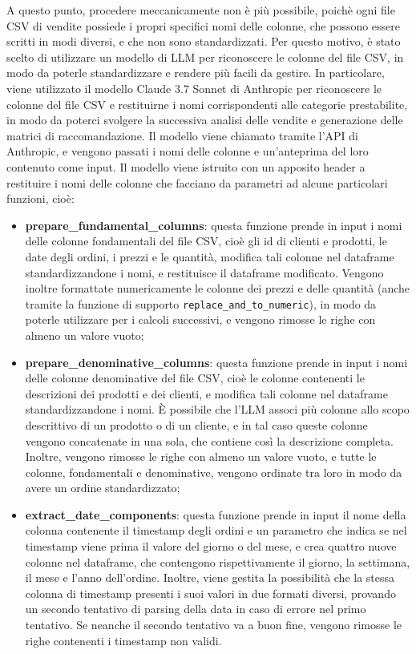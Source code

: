 A questo punto, procedere meccanicamente non è più possibile, poichè ogni file CSV di vendite possiede i propri specifici nomi delle colonne, che possono essere scritti in modi diversi, e che non sono standardizzati. Per questo motivo, è stato scelto di utilizzare un modello di LLM per riconoscere le colonne del file CSV, in modo da poterle standardizzare e rendere più facili da gestire. In particolare, viene utilizzato il modello Claude 3.7 Sonnet di Anthropic per riconoscere le colonne del file CSV e restituirne i nomi corrispondenti alle categorie prestabilite, in modo da poterci svolgere la successiva analisi delle vendite e generazione delle matrici di raccomandazione. Il modello viene chiamato tramite l'API di Anthropic, e vengono passati i nomi delle colonne e un'anteprima del loro contenuto come input. Il modello viene istruito con un apposito header a restituire i nomi delle colonne che facciano da parametri ad alcune particolari funzioni, cioè:
\begin{itemize}
    \item \textbf{prepare\_fundamental\_columns}: questa funzione prende in input i nomi delle colonne fondamentali del file CSV, cioè gli id di clienti e prodotti, le date degli ordini, i prezzi e le quantità, modifica tali colonne nel dataframe standardizzandone i nomi, e restituisce il dataframe modificato. Vengono inoltre formattate numericamente le colonne dei prezzi e delle quantità (anche tramite la funzione di supporto \texttt{replace\_and\_to\_numeric}), in modo da poterle utilizzare per i calcoli successivi, e vengono rimosse le righe con almeno un valore vuoto;
    \item \textbf{prepare\_denominative\_columns}: questa funzione prende in input i nomi delle colonne denominative del file CSV, cioè le colonne contenenti le descrizioni dei prodotti e dei clienti, e modifica tali colonne nel dataframe standardizzandone i nomi. È possibile che l'LLM associ più colonne allo scopo descrittivo di un prodotto o di un cliente, e in tal caso queste colonne vengono concatenate in una sola, che contiene così la descrizione completa. Inoltre, vengono rimosse le righe con almeno un valore vuoto, e tutte le colonne, fondamentali e denominative, vengono ordinate tra loro in modo da avere un ordine standardizzato;
    \item \textbf{extract\_date\_components}: questa funzione prende in input il nome della colonna contenente il timestamp degli ordini e un parametro che indica se nel timestamp viene prima il valore del giorno o del mese, e crea quattro nuove colonne nel dataframe, che contengono rispettivamente il giorno, la settimana, il mese e l'anno dell'ordine. Inoltre, viene gestita la possibilità che la stessa colonna di timestamp presenti i suoi valori in due formati diversi, provando un secondo tentativo di parsing della data in caso di errore nel primo tentativo. Se neanche il secondo tentativo va a buon fine, vengono rimosse le righe contenenti i timestamp non validi.
\end{itemize}

